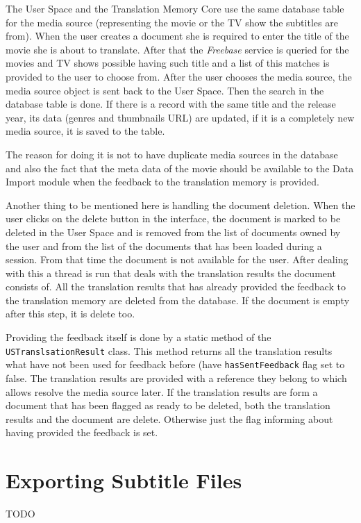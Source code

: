 The User Space and the Translation Memory Core use the same database table for the media source (representing the movie or the TV show the subtitles are from). When the user creates a document she is required to enter the title of the movie she is about to translate. After that the {\it Freebase} service is queried for the movies and TV shows possible having such title and a list of this matches is provided to the user to choose from. After the user chooses the media source, the media source object is sent back to the User Space. Then the search in the database table is done. If there is a record with the same title and the release year, its data (genres and thumbnails URL) are updated, if it is a completely new media source, it is saved to the table.

The reason for doing it is not to have duplicate media sources in the database and also the fact that the meta data of the movie should be available to the Data Import module when the feedback to the translation memory is provided.

Another thing to be mentioned here is handling the document deletion. When the user clicks on the delete button in the interface, the document is marked to be deleted in the User Space and is removed from the list of documents owned  by the user and from the list of the documents that has been loaded during a session. From that time the document is not available for the user. After dealing with this a thread is run that deals with the translation results the document consists of. All the translation results that has already provided the feedback to the translation memory are deleted from the database. If the document is empty after this step, it is delete too.

Providing the feedback itself is done by a static method of the {\tt USTranslsationResult} class. This method returns all the translation results what have not been used for feedback before (have {\tt hasSentFeedback} flag set to false. The translation results are provided with a reference they belong to which allows resolve the media source later. If the translation results are form a document that has been flagged as ready to be deleted, both the translation results and the document are delete. Otherwise just the flag informing about having provided the feedback is set.

\section{Exporting Subtitle Files}
\label{sec:export}

TODO 

